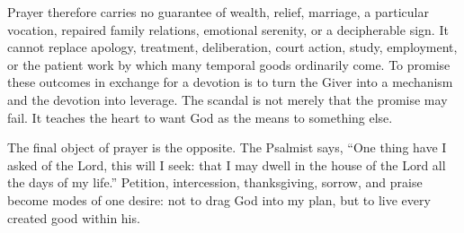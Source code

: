 Prayer therefore carries no guarantee of wealth, relief, marriage, a particular vocation, repaired family relations, emotional serenity, or a decipherable sign. It cannot replace apology, treatment, deliberation, court action, study, employment, or the patient work by which many temporal goods ordinarily come. To promise these outcomes in exchange for a devotion is to turn the Giver into a mechanism and the devotion into leverage. The scandal is not merely that the promise may fail. It teaches the heart to want God as the means to something else.

The final object of prayer is the opposite. The Psalmist says, ``One thing have I asked of the Lord, this will I seek: that I may dwell in the house of the Lord all the days of my life.'' Petition, intercession, thanksgiving, sorrow, and praise become modes of one desire: not to drag God into my plan, but to live every created good within his.
